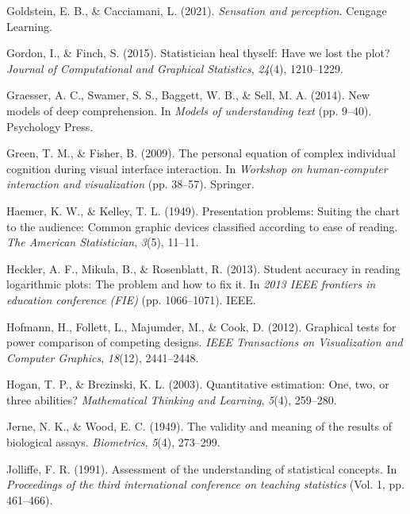 \documentclass[print]{nuthesis}
\newlength{\cslhangindent}
\newenvironment{CSLReferences}[2]%
{\setlength{\parindent}{0pt}%
\everypar{\setlength{\hangindent}{\cslhangindent}}\ignorespaces}%
{\par}
\begin{document}
\begin{CSLReferences}{1}{0}
\leavevmode{}%
Goldstein, E. B., \& Cacciamani, L. (2021). \emph{Sensation and perception}. Cengage Learning.

\leavevmode{}%
Gordon, I., \& Finch, S. (2015). Statistician heal thyself: Have we lost the plot? \emph{Journal of Computational and Graphical Statistics}, \emph{24}(4), 1210--1229.

\leavevmode{}%
Graesser, A. C., Swamer, S. S., Baggett, W. B., \& Sell, M. A. (2014). New models of deep comprehension. In \emph{Models of understanding text} (pp. 9--40). Psychology Press.

\leavevmode{}%
Green, T. M., \& Fisher, B. (2009). The personal equation of complex individual cognition during visual interface interaction. In \emph{Workshop on human-computer interaction and visualization} (pp. 38--57). Springer.

\leavevmode{}%
Haemer, K. W., \& Kelley, T. L. (1949). Presentation problems: Suiting the chart to the audience: Common graphic devices classified according to ease of reading. \emph{The American Statistician}, \emph{3}(5), 11--11.

\leavevmode{}%
Heckler, A. F., Mikula, B., \& Rosenblatt, R. (2013). Student accuracy in reading logarithmic plots: The problem and how to fix it. In \emph{2013 IEEE frontiers in education conference (FIE)} (pp. 1066--1071). IEEE.

\leavevmode{}%
Hofmann, H., Follett, L., Majumder, M., \& Cook, D. (2012). Graphical tests for power comparison of competing designs. \emph{IEEE Transactions on Visualization and Computer Graphics}, \emph{18}(12), 2441--2448.

\leavevmode{}%
Hogan, T. P., \& Brezinski, K. L. (2003). Quantitative estimation: One, two, or three abilities? \emph{Mathematical Thinking and Learning}, \emph{5}(4), 259--280.

\leavevmode{}%
Jerne, N. K., \& Wood, E. C. (1949). The validity and meaning of the results of biological assays. \emph{Biometrics}, \emph{5}(4), 273--299.

\leavevmode{}%
Jolliffe, F. R. (1991). Assessment of the understanding of statistical concepts. In \emph{Proceedings of the third international conference on teaching statistics} (Vol. 1, pp. 461--466).


\end{CSLReferences}
\end{document}
